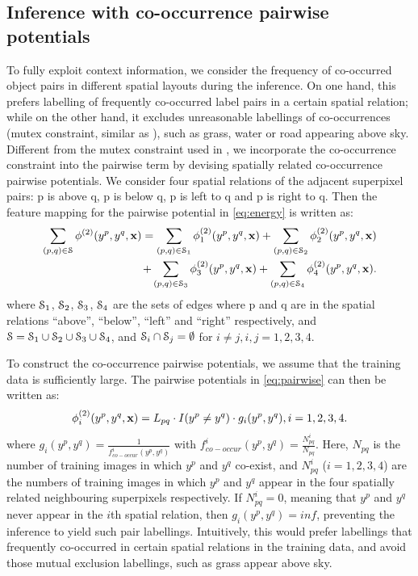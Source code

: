 \documentclass[10pt,3p]{elsarticle}
\def\bx{{\bf x}}
\let\x\bx
\begin{document}
\subsection{Inference with co-occurrence pairwise potentials}
\label{sec:co-occur}
To fully exploit context information, we consider the frequency of co-occurred object pairs in different spatial layouts during the inference.
On one hand, this prefers labelling of frequently co-occurred label pairs  in a certain spatial relation; while on the other hand, it excludes unreasonable labellings of co-occurrences (mutex constraint, similar as \cite{Roy14}), such as grass, water or road appearing above sky.
Different from the mutex constraint used in \cite{Roy14}, we incorporate the co-occurrence constraint into the pairwise term by devising spatially related co-occurrence pairwise potentials.
We consider four spatial relations of the adjacent superpixel pairs: p is above q, p is below q, p is left to q and p is right to q. Then the feature mapping for the pairwise potential in \eqref{eq:energy} is written as:
\begin{align}
\label{eq:pairwise}
 \sum_{(p,q) \in {\cal S}} \phi^{(2)}(y^{p}, y^{q}, \x)   =  \sum_{(p,q) \in {\cal S}_1} \phi_1^{(2)} (y^p, y^q, \x)  + \sum_{(p,q) \in {\cal S}_2} \phi_2^{(2)} (y^p, y^q, \x) \nonumber \\
+ \sum_{(p,q) \in {\cal S}_3} \phi_3^{(2)} (y^p, y^q, \x)  + \sum_{(p,q) \in {\cal S}_4} \phi_4^{(2)} (y^p, y^q, \x) .
\end{align}
where
${\cal S}_1$, ${\cal S}_2$, ${\cal S}_3$, ${\cal S}_4$ are the sets of edges where p and q are in the spatial relations ``above'', ``below'', ``left'' and ``right'' respectively, and ${\cal S} = {\cal S}_1 \cup {\cal S}_2 \cup {\cal S}_3 \cup {\cal S}_4$, and ${\cal S}_i \cap {\cal S}_j=\emptyset$ for $i \neq j, i,j=1,2,3,4$.


To construct the co-occurrence pairwise potentials, we assume that the training data is sufficiently large.
The pairwise potentials in \eqref{eq:pairwise} can then be written as:
\begin{align}
\phi_i^{(2)}(y^p, y^q, \x)= L_{pq} \cdot I(y^p \neq y^q) \cdot g_i(y^p, y^q), i=1,2,3,4.
\end{align}
where $g_i(y^p, y^q) = \frac{1}{f^i_{co-occur}(y^p, y^q)}$ with $f^i_{co-occur}(y^p, y^q)=\frac{N^i_{pq}}{N_{pq}}$. Here, $N_{pq}$ is the number of training images in which $y^p$ and $y^q$ co-exist, and $N^i_{pq}$ ($i=1,2,3,4$) are the numbers of training images in which $y^p$ and $y^q$ appear in the four spatially related neighbouring superpixels respectively.
If $N^i_{pq}=0$, meaning that  $y^p$ and $y^q$  never appear in the $i$th spatial relation, then $g_i(y^p, y^q)=inf$, preventing the inference to yield such pair labellings.
Intuitively, this would prefer labellings that frequently co-occurred in certain spatial relations in the training data, and  avoid those mutual exclusion labellings,  such as grass appear above sky.
\end{document}
